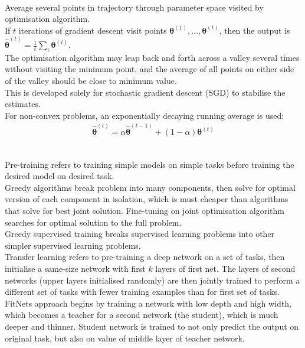 \begin{remark} \\
Average several points in trajectory through parameter space visited by optimisation algorithm.\\
If $t$ iterations of gradient descent visit points $\bm{\theta}^{(1)}, \ldots, \bm{\theta}^{(t)}$, then the output is $\hat{\bm{\theta}}^{(t)} = \frac{1}{t} \sum_i \bm{\theta}^{(i)}$.\\
The optimisation algorithm may leap back and forth across a valley several times without visiting the minimum point, and the average of all points on either side of the valley should be close to minimum value.\\
This is developed solely for stochastic gradient descent (SGD) to stabilise the estimates.\\
For non-convex problems, an exponentially decaying running average is used:
\begin{align}
\hat{\bm{\theta}}^{(t)} = \alpha \hat{\bm{\theta}}^{(t-1)} + (1- \alpha)\bm{\theta}^{(t)} \nonumber
\end{align}
\end{remark}

\begin{remark} \\
Pre-training refers to training simple models on simple tasks before training the desired model on desired task.\\
Greedy algorithms break problem into many components, then solve for optimal version of each component in isolation, which is must cheaper than algorithms that solve for best joint solution. Fine-tuning on joint optimisation algorithm searches for optimal solution to the full problem.\\
Greedy supervised training breaks supervised learning problems into other simpler supervised learning problems.\\
Transfer learning refers to pre-training a deep network on a set of tasks, then initialise a same-size network with first $k$ layers of first net. The layers of second networks (upper layers initialised randomly) are then jointly trained to perform a different set of tasks with fewer training examples than for first set of tasks.\\
FitNets approach begins by training a network with low depth and high width, which becomes a teacher for a second network (the student), which is much deeper and thinner. Student network is trained to not only predict the output on original task, but also on value of middle layer of teacher network.
\end{remark}


